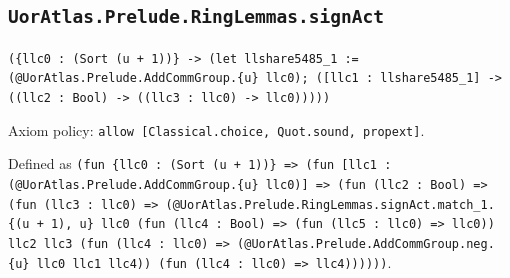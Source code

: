 \documentclass[11pt]{article}
\begin{document}
\subsection*{\texttt{UorAtlas.Prelude.RingLemmas.signAct}}
\noindent\texttt{(\{llc0 : (Sort (u + 1))\} -> (let llshare5485\_1 := (@UorAtlas.Prelude.AddCommGroup.\{u\} llc0); ([llc1 : llshare5485\_1] -> ((llc2 : Bool) -> ((llc3 : llc0) -> llc0)))))}\par
\noindent Axiom policy: \texttt{allow [Classical.choice, Quot.sound, propext]}.\par
\noindent Defined as \texttt{(fun \{llc0 : (Sort (u + 1))\} => (fun [llc1 : (@UorAtlas.Prelude.AddCommGroup.\{u\} llc0)] => (fun (llc2 : Bool) => (fun (llc3 : llc0) => (@UorAtlas.Prelude.RingLemmas.signAct.match\_1.\{(u + 1), u\} llc0 (fun (llc4 : Bool) => (fun (llc5 : llc0) => llc0)) llc2 llc3 (fun (llc4 : llc0) => (@UorAtlas.Prelude.AddCommGroup.neg.\{u\} llc0 llc1 llc4)) (fun (llc4 : llc0) => llc4))))))}.\par
\end{document}
